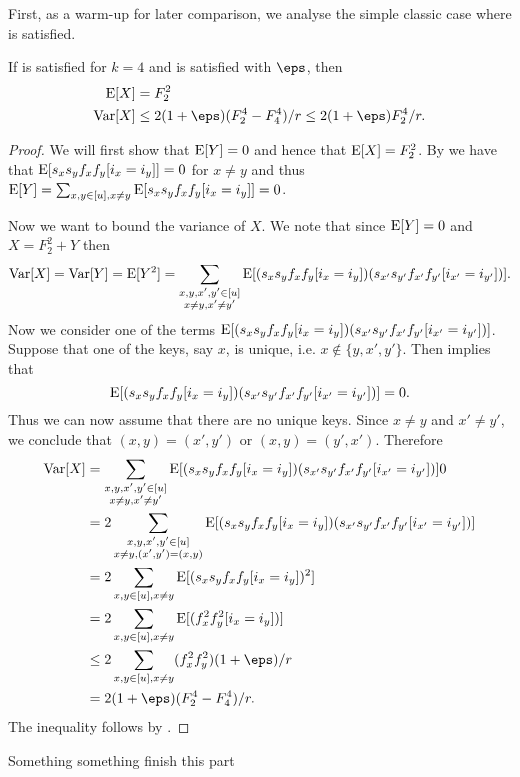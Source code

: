 First, as a warm-up for later comparison, we analyse the simple classic
case where  is satisfied.
\begin{lemma}
    If  is satisfied for $k = 4$ and 
    is satisfied with $\eps$, then
    \begin{align}
        \E[X] &= F_2^2 \\
        \Var[X] &\le 2(1 + \eps)(F_2^4 - F_4^4)/r \le 2(1 + \eps)F_2^4/r .
    \end{align}
\end{lemma}
\begin{proof}
    We will first show that $\operatorname*{E}[Y] = 0$ and hence that $\operatorname*{E}[X] = F_2^2$. By
     we have that $\operatorname*{E}[s_x s_y f_x f_y [i_x = i_y]] = 0$
    for $x \neq y$ and thus $\operatorname*{E}[Y] = \sum_{x,y\in[u],x\neq y} \operatorname*{E}[s_x s_y f_x f_y [i_x = i_y]] = 0$.

    Now we want to bound the variance of $X$. We note that since $\operatorname*{E}[Y] = 0$ and $X = F_2^2 + Y$ then
    \begin{align*}
        \operatorname*{Var}[X] = \operatorname*{Var}[Y] = \operatorname*{E}[Y^2]
            = \sum_{\substack{x, y, x', y' \in [u]\\ x \neq y, x' \neq y'}} \operatorname*{E}[(s_x s_y f_x f_y [i_x = i_y])(s_{x'} s_{y'} f_{x'} f_{y'} [i_{x'} = i_{y'}])] .
    \end{align*}
    Now we consider one of the terms $\operatorname*{E}[(s_x s_y f_x f_y [i_x = i_y])(s_{x'} s_{y'} f_{x'} f_{y'} [i_{x'} = i_{y'}])]$.
    Suppose that one of the keys, say $x$, is unique, i.e. $x \not\in \{y, x', y'\}$.
    Then  implies that 
    \[
        \operatorname*{E}[(s_x s_y f_x f_y [i_x = i_y])(s_{x'} s_{y'} f_{x'} f_{y'} [i_{x'} = i_{y'}])] = 0 .
    \]
    Thus we can now assume that there are no unique keys. Since $x \neq y$ and $x' \neq y'$, we conclude
    that $(x, y) = (x', y')$ or $(x, y) = (y', x')$. Therefore
    \begin{align*}
       \Var[X] &= \sum_{\substack{x, y, x', y' \in [u]\\ x \neq y, x' \neq y'}}
                \E[(s_x s_y f_x f_y [i_x = i_y])(s_{x'} s_{y'} f_{x'} f_{y'} [i_{x'} = i_{y'}])]0
            \\&= 2 \sum_{\substack{x, y, x', y' \in [u]\\ x \neq y, (x', y') = (x, y)}}
                \E[(s_x s_y f_x f_y [i_x = i_y])(s_{x'} s_{y'} f_{x'} f_{y'} [i_{x'} = i_{y'}])]
            \\&= 2\sum_{x,y\in[u],x\neq y} \E[(s_x s_y f_x f_y[i_x=i_y])^2]
            \\&= 2\sum_{x,y\in[u],x\neq y} \E[(f_x^2f_y^2[i_x=i_y])]
            \\&\le 2\sum_{x,y\in[u],x\neq y} (f_x^2f_y^2)(1 + \eps)/r
            \\&= 2(1 + \eps) (F_2^4-F_4^4)/r.
    \end{align*}
    The inequality follows by .
\end{proof}
Something something finish this part

